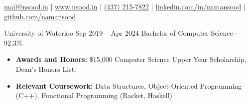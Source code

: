 \documentclass{article}
\begin{document}
    
\vspace{1mm}
{\hfill \href{mailto:mail@nsood.in}{mail@nsood.in} | 
        \href{https://www.nsood.in}{www.nsood.in} | 
        \href{tel:4372157822}{(437) 215-7822} | 
        \href{https://linkedin.com/in/namansood}{linkedin.com/in/namansood} |
        \href{https://github.com/namansood}{github.com/namansood}
\hfill}

\EducationEntry
{University of Waterloo}
{Sep 2019 -- Apr 2024}
{Bachelor of Computer Science -- 92.3\%}
{\begin{itemize} \itemsep -1pt
    \vspace{1mm}
    \item {\bf Awards and Honors:} \$15,000 Computer Science Upper Year Scholarship, Dean's Honors List.
    \item {\bf Relevant Coursework:} Data Structures, Object-Oriented Programming (C++), Functional Programming (Racket, Haskell)
    \end{itemize}}

\normalsize
{}
\vspace{1mm} %
\end{document}
